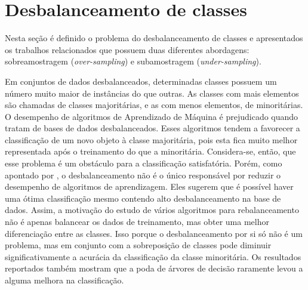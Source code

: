 %

\section{Desbalanceamento de classes}
\label{cap:desbalanceamento}

Nesta seção é definido o problema do desbalanceamento de classes e apresentados os trabalhos relacionados que possuem duas diferentes abordagens: sobreamostragem (\textit{over-sampling}) e subamostragem (\textit{under-sampling}).

Em conjuntos de dados desbalanceados, determinadas classes possuem um número muito maior de instâncias do que outras. As classes com mais elementos são chamadas de classes majoritárias, e as com menos elementos, de minoritárias. O desempenho de algoritmos de Aprendizado de Máquina é prejudicado quando tratam de bases de dados desbalanceados. Esses algoritmos tendem a favorecer a classificação de um novo objeto à classe majoritária, pois esta fica muito melhor representada após o treinamento do que a minoritária. Considera-se, então, que esse problema é um obstáculo para a classificação satisfatória. Porém, como apontado por \cite{Batista2004}, o desbalanceamento não é o único responsável por reduzir o desempenho de algoritmos de aprendizagem. Eles sugerem que é possível haver uma ótima classificação mesmo contendo alto desbalanceamento na base de dados. Assim, a motivação do estudo de vários algoritmos para rebalanceamento não é apenas balancear os dados de treinamento, mas obter uma melhor diferenciação entre as classes. Isso porque o desbalanceamento por si só não é um problema, mas em conjunto com a sobreposição de classes pode diminuir significativamente a acurácia da classificação da classe minoritária. Os resultados reportados também mostram que a poda de árvores de decisão raramente levou a alguma melhora na classificação.

